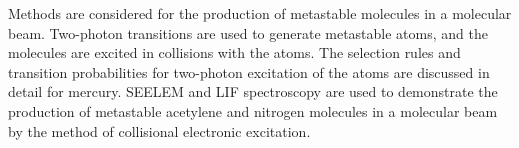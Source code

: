 




Methods are considered for the production of metastable molecules in a
molecular beam.  Two-photon transitions are used to generate
metastable atoms, and the molecules are excited in collisions with the
atoms.  The selection rules and transition probabilities for
two-photon excitation of the atoms are discussed in detail for
mercury.  SEELEM and LIF spectroscopy are used to demonstrate the
production of metastable acetylene and nitrogen molecules in a
molecular beam by the method of collisional electronic excitation.






